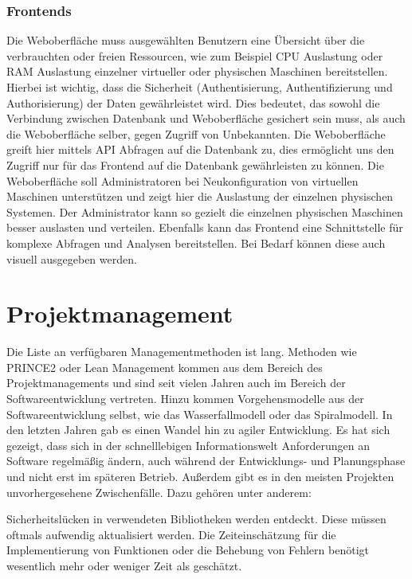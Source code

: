 \subsubsection{Frontends}
Die Weboberfläche muss ausgewählten Benutzern eine Übersicht über die
verbrauchten oder freien Ressourcen, wie zum Beispiel CPU Auslastung oder RAM
Auslastung einzelner virtueller oder physischen Maschinen bereitstellen.
Hierbei ist wichtig, dass die Sicherheit (Authentisierung, Authentifizierung
und Authorisierung) der Daten gewährleistet wird. Dies bedeutet, das sowohl die
Verbindung zwischen Datenbank und Weboberfläche gesichert sein muss, als auch
die Weboberfläche selber, gegen Zugriff von Unbekannten. Die Weboberfläche
greift hier mittels API Abfragen auf die Datenbank zu, dies ermöglicht uns den
Zugriff nur für das Frontend auf die Datenbank gewährleisten zu können.  Die
Weboberfläche soll Administratoren bei Neukonfiguration von virtuellen
Maschinen unterstützen und zeigt hier die Auslastung der einzelnen physischen
Systemen. Der Administrator kann so gezielt die einzelnen physischen Maschinen
besser auslasten und verteilen. Ebenfalls kann das Frontend eine Schnittstelle
für komplexe Abfragen und Analysen bereitstellen. Bei Bedarf können diese auch
visuell ausgegeben werden.
\mr%

\section{Projektmanagement}
Die Liste an verfügbaren Managementmethoden ist lang. Methoden wie PRINCE2 oder
Lean Management kommen aus dem Bereich des Projektmanagements und sind seit
vielen Jahren auch im Bereich der Softwareentwicklung vertreten. Hinzu kommen
Vorgehensmodelle aus der Softwareentwicklung selbst, wie das Wasserfallmodell
oder das Spiralmodell. In den letzten Jahren gab es einen Wandel hin zu agiler
Entwicklung. Es hat sich gezeigt, dass sich in der schnelllebigen
Informationswelt Anforderungen an Software regelmäßig ändern, auch während der
Entwicklungs- und Planungsphase und nicht erst im späteren Betrieb. Außerdem
gibt es in den meisten Projekten unvorhergesehene Zwischenfälle. Dazu gehören
unter anderem:

\begin{outline}
  \1 Sicherheitslücken in verwendeten Bibliotheken werden entdeckt. Diese
  müssen oftmals aufwendig aktualisiert werden.
  \1 Die Zeiteinschätzung für die Implementierung von Funktionen oder die
  Behebung von Fehlern benötigt wesentlich mehr oder weniger Zeit als
  geschätzt.
\end{outline}

